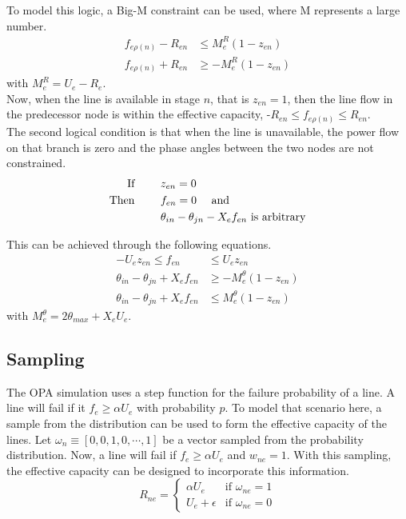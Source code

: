 To model this logic, a Big-M constraint can be used, where M represents a large number.
\begin{align}
	f_{e\rho(n)} - R_{en} &\le M^R_e (1-z_{en})	\label{r1}\\
	f_{e\rho(n)} + R_{en} &\ge - M^R_e (1-z_{en})	\label{r2}
\end{align}
with $M^R_e = U_e - R_e$. \\

Now, when the line is available in stage $n$, that is $z_{en} = 1$, then the line flow in the predecessor node is within the effective capacity, -$R_{en} \le f_{e\rho(n)} \le R_{en}$.		\\

The second logical condition is that when the line is unavailable, the power flow on that branch is zero and the phase angles between the two nodes are not constrained. 
\begin{align*}
\mbox{If }
		\hspace{20px}&z_{en} = 0	\\
\mbox{Then }
		\hspace{20px}&f_{en} = 0  \hspace{10px} \mbox{ and}\\
				&\theta_{in} - \theta_{jn} - X_{e}f_{en} \mbox{ is arbitrary}
\end{align*}	

This can be achieved through the following equations.
\begin{align}
-U_{e} z_{en} \le f_{en} &\le U_{e} z_{en}	\label{lf1}\\
\theta_{in} - \theta_{jn} + X_e f_{en} &\ge -M^\theta_e(1-z_{en}) \label{lf2} \\
\theta_{in} - \theta_{jn} + X_e f_{en} &\le M^\theta_e(1-z_{en})  \label{lf3}
\end{align}
with $M^\theta_e = 2 \theta_{max} + X_e U_e$.

\subsection{Sampling}
The OPA simulation uses a step function for the failure probability of a line.  A line will fail if it $f_e \ge \alpha U_e$ with probability $p$.    To model that scenario here, a sample from the distribution can be used to form the effective capacity of the lines.  Let $\omega_n \equiv\left[ 0, 0, 1, 0, \cdots, 1\right]$  be a vector sampled from the probability distribution.  Now, a line will fail if $f_e \ge \alpha U_e$ and $w_{ne} =1$.  With this sampling, the effective capacity can be designed to incorporate this information.    
\begin{equation}
 R_{ne} = 
 \left\{ 
	\begin{array}{lr}
				\alpha U_e & \mbox{if } \omega_{ne}=1\\
			  U_e + \epsilon & \mbox{if } \omega_{ne}=0
	\end{array}
 \right. \label{r}
\end{equation}

